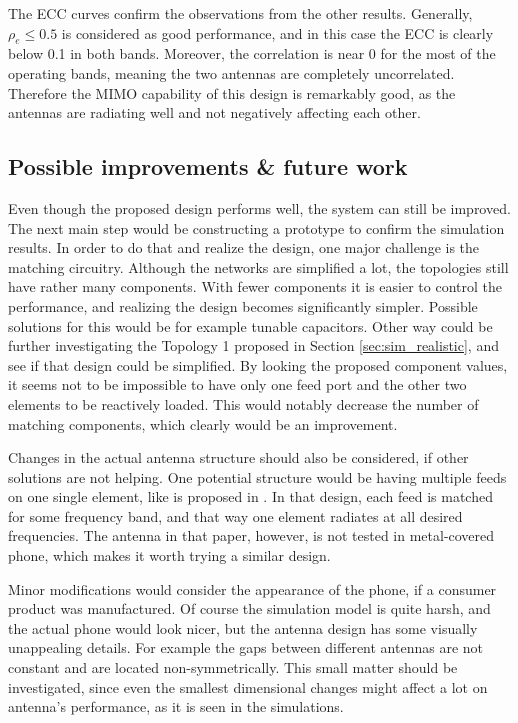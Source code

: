 The ECC curves confirm the observations from the other results. Generally, $\rho_e\leq0.5$ is considered as good performance, and in this case the ECC is clearly below 0.1 in both bands. Moreover, the correlation is near 0 for the most of the operating bands, meaning the two antennas are completely uncorrelated. Therefore the MIMO capability of this design is remarkably good, as the antennas are radiating well and not negatively affecting each other.

\subsection{Possible improvements \& future work}
\label{sec:improvements}
Even though the proposed design performs well, the system can still be improved. The next main step would be constructing a prototype to confirm the simulation results. In order to do that and realize the design, one major challenge is the matching circuitry. Although the networks are simplified a lot, the topologies still have rather many components. With fewer components it is easier to control the performance, and realizing the design becomes significantly simpler. Possible solutions for this would be for example tunable capacitors. Other way could be further investigating the Topology 1 proposed in Section \ref{sec:sim_realistic}, and see if that design could be simplified. By looking the proposed component values, it seems not to be impossible to have only one feed port and the other two elements to be reactively loaded. This would notably decrease the number of matching components, which clearly would be an improvement.

Changes in the actual antenna structure should also be considered, if other solutions are not helping. One potential structure would be having multiple feeds on one single element, like is proposed in \cite{valkonen_multifeed}. In that design, each feed is matched for some frequency band, and that way one element radiates at all desired frequencies. The antenna in that paper, however, is not tested in metal-covered phone, which makes it worth trying a similar design.

Minor modifications would consider the appearance of the phone, if a consumer product was manufactured. Of course the simulation model is quite harsh, and the actual phone would look nicer, but the antenna design has some visually unappealing details. For example the gaps between different antennas are not constant and are located non-symmetrically. This small matter should be investigated, since even the smallest dimensional changes might affect a lot on antenna's performance, as it is seen in the simulations.

